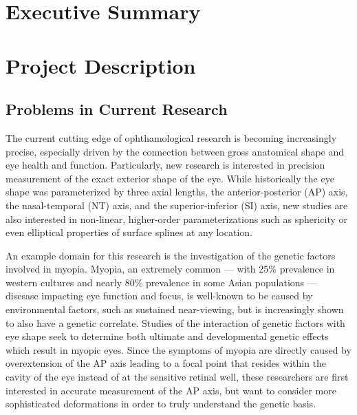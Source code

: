 \documentclass{article}
\begin{document}

\setcounter{tocdepth}{2}
\tableofcontents
\newpage
\section{Executive Summary}
\label{sec:exec-summary}

\section{Project Description}
\label{sec:project-description}

\subsection{Problems in Current Research}
\label{sec:probl-curr-rese}

The current cutting edge of ophthamological research is becoming increasingly precise, especially driven by the connection between gross anatomical shape and eye health and function. Particularly, new research is interested in precision measurement of the exact exterior shape of the eye\cite{atchison04,zhou99:genes,zhou99:models,guggenheim04,wallman04}. While historically the eye shape was parameterized by three axial lengths, the anterior-posterior (AP) axis, the nasal-temporal (NT) axis, and the superior-inferior (SI) axis, new studies are also interested in non-linear, higher-order parameterizations such as sphericity or even elliptical properties of surface splines at any location.

An example domain for this research is the investigation of the genetic factors involved in myopia. Myopia, an extremely common --- with 25\% prevalence in western cultures and nearly 80\% prevalence in some Asian populations\cite{rajan98} --- disesase impacting eye function and focus, is well-known to be caused by environmental factors, such as sustained near-viewing, but is increasingly shown to also have a genetic correlate\cite{zhou99:genes,zhou99:models,schmucker04}. Studies of the interaction of genetic factors with eye shape seek to determine both ultimate and developmental genetic effects which result in myopic eyes. Since the symptoms of myopia are directly caused by overextension of the AP axis leading to a focal point that resides within the cavity of the eye instead of at the sensitive retinal well, these researchers are first interested in accurate measurement of the AP axis\cite{wallman04}, but want to consider more sophisticated deformations in order to truly understand the genetic basis\cite{schaeffel04}.
\end{document}
